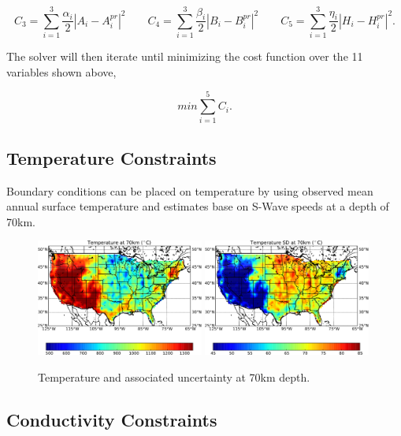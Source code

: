 \documentclass[a4paper,10pt]{article}
\begin{document}
 \begin{equation}
C_3=\sum_{i=1}^3\frac{\alpha_i}{2}\left | A_i-A^{pr}_i\right |^2 \quad \quad  C_4=\sum_{i=1}^3\frac{\beta_i}{2}\left | B_i-B^{pr}_i\right |^2 \quad  \quad C_5=\sum_{i=1}^3\frac{\eta_i}{2}\left | H_i-H^{pr}_i\right |^2.
 \end{equation}
 
 
\noindent The solver will then iterate until minimizing the cost function over the 11 variables shown above, 
 
 \begin{equation}
 min \sum_{i=1}^5 C_i.
 \end{equation}
 
\subsection{Temperature Constraints}
  
Boundary conditions can be placed on temperature by using observed mean annual surface temperature and estimates base on S-Wave speeds at a depth of 70km.  
  
\begin{figure}[h]
\includegraphics[width=0.49\textwidth]{TempMap70-crop.pdf} \quad
\includegraphics[width=0.49\textwidth]{UncertainTempMap70-crop.pdf}
\caption{Temperature and associated uncertainty at 70km depth.}
\end{figure}
  
  
\subsection{Conductivity Constraints}
  
\end{document}
